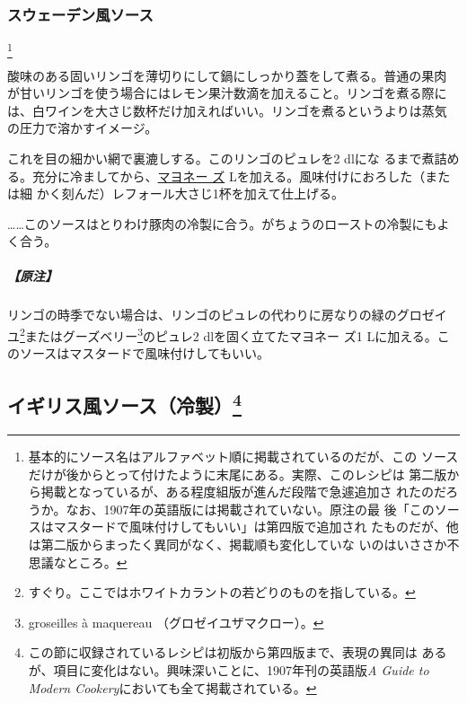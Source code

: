 \begin{recette}
\maeaki

\hypertarget{sauce-suedoise}{%
\subsubsection{スウェーデン風ソース}\label{sauce-suedoise}}

\footnote{基本的にソース名はアルファベット順に掲載されているのだが、この
  ソースだけが後からとって付けたように末尾にある。実際、このレシピは
  第二版から掲載となっているが、ある程度組版が進んだ段階で急遽追加さ
  れたのだろうか。なお、1907年の英語版には掲載されていない。原注の最
  後「このソースはマスタードで風味付けしてもいい」は第四版で追加され
  たものだが、他は第二版からまったく異同がなく、掲載順も変化していな
  いのはいささか不思議なところ。}


酸味のある固いリンゴを薄切りにして鍋にしっかり蓋をして煮る。普通の果肉
が甘いリンゴを使う場合にはレモン果汁数滴を加えること。リンゴを煮る際に
は、白ワインを大さじ数杯だけ加えればいい。リンゴを煮るというよりは蒸気
の圧力で溶かすイメージ。

これを目の細かい網で裏漉しする。このリンゴのピュレを2\undemi{} dlにな
るまで煮詰める。充分に冷ましてから、\protect\hyperlink{mayonnaise}{マヨネー
ズ}\troisquarts{} Lを加える。風味付けにおろした（または細
かく刻んだ）レフォール大さじ1\undemi{}杯を加えて仕上げる。

\ldots{}\ldots{}このソースはとりわけ豚肉の冷製に合う。がちょうのローストの冷製にもよく合う。

\hypertarget{nota-sauce-suedoise}{%
\subparagraph{【原注】}\label{nota-sauce-suedoise}}

リンゴの時季でない場合は、リンゴのピュレの代わりに房なりの緑のグロゼイ
ユ\footnote{すぐり。ここではホワイトカラントの若どりのものを指している。}またはグーズベリー\footnote{groseilles
  à maquereau （グロゼイユザマクロー）。}のピュレ2\undemi{}
dlを固く立てたマヨネー ズ1
Lに加える。このソースはマスタードで風味付けしてもいい。
\end{recette}
\hypertarget{sauces-froides-anglaises}{%
\subsection[イギリス風ソース（冷製）]{\texorpdfstring{イギリス風ソース（冷製）\footnote{この節に収録されているレシピは初版から第四版まで、表現の異同は
  あるが、項目に変化はない。興味深いことに、1907年刊の英語版\emph{A
  Guide to Modern Cookery}においても全て掲載されている。}}{イギリス風ソース（冷製）}}\label{sauces-froides-anglaises}}


